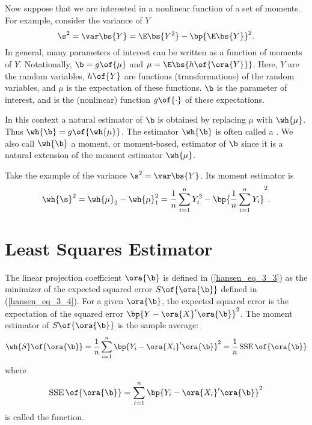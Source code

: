 Now suppose that we are interested in a nonlinear function of a set of moments. For example, consider the variance of $Y$
\begin{equation}
    \notag
    \s^2 = \var\bs{Y} = \E\bs{Y^2} - \bp{\E\bs{Y}}^2.
\end{equation}
In general, many parameters of interest can be written as a function of moments of $Y$. Notationally, $\b = g\of{\mu}$ and $\mu = \E\bs{h\of{\ora{Y}}}$. Here, $Y$ are the random variables, $h\of{Y}$ are functions (transformations) of the random variables, and $\mu$ is the expectation of these functions. $\b$ is the parameter of interest, and is the (nonlinear) function $g\of{\cdot}$ of these expectations.

In this context a natural estimator of $\b$ is obtained by replacing $\mu$ with $\wh{\mu}$. Thus $\wh{\b} = g\of{\wh{\mu}}$. The estimator $\wh{\b}$ is often called a . We also call $\wh{\b}$ a moment, or moment-based, estimator of $\b$ since it is a natural extension of the moment estimator $\wh{\mu}$.

Take the example of the variance $\s^2 = \var\bs{Y}$. Its moment estimator is 
\begin{equation}
    \notag
    \wh{\s}^2 = \wh{\mu}_2 - \wh{\mu}_1^2 = \frac{1}{n} \sum_{i=1}^n Y_i^2 - \bp{\frac{1}{n} \sum_{i=1}^n Y_i}^2.
\end{equation}


\section{Least Squares Estimator}

The linear projection coefficient $\ora{\b}$ is defined in (\ref{hansen_eq_3_3}) as the minimizer of the expected squared error $S\of{\ora{\b}}$ defined in (\ref{hansen_eq_3_4}). For a given $\ora{\b}$, the expected squared error is the expectation of the squared error $\bp{Y - \ora{X}^{\prime} \ora{\b}}^2$. The moment estimator of $S\of{\ora{\b}}$ is the sample average:
\begin{equation}
    \label{hansen_eq_3_6}
    \wh{S}\of{\ora{\b}} = \frac{1}{n} \sum_{i=1}^n \bp{Y_i - \ora{X_i}^\prime\ora{\b}}^2 = \frac{1}{n} \operatorname*{SSE}\of{\ora{\b}}
\end{equation}
where 
\begin{equation}
    \notag
    \operatorname*{SSE}\of{\ora{\b}} = \sum_{i=1}^n \bp{Y_i - \ora{X_i}^\prime\ora{\b}}^2
\end{equation}
is called the  function.

